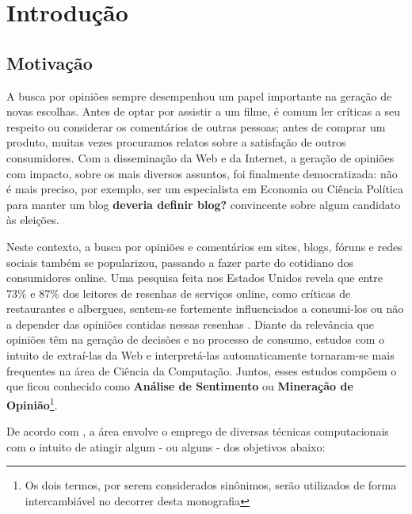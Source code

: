 \chapter{Introdução}

\section{Motivação}

A busca por opiniões sempre desempenhou um papel importante na geração de novas escolhas. Antes de optar por assistir a um filme, é comum ler críticas a seu respeito ou considerar os comentários de outras pessoas; antes de comprar um produto, muitas vezes procuramos relatos sobre a satisfação de outros consumidores. Com a disseminação da Web e da Internet, a geração de opiniões com impacto, sobre os mais diversos assuntos, foi finalmente democratizada: não é mais preciso, por exemplo, ser um especialista em Economia ou Ciência Política para manter um blog \textbf{deveria definir blog?} convincente sobre algum candidato às eleições.

Neste contexto, a busca por opiniões e comentários em sites, blogs, fóruns e redes sociais também se popularizou, passando a fazer parte do cotidiano dos consumidores online. Uma pesquisa feita nos Estados Unidos revela que entre 73\% e 87\% dos leitores de resenhas de serviços online, como críticas de restaurantes e albergues, sentem-se fortemente influenciados a consumi-los ou não a depender das opiniões contidas nessas resenhas \cite{pesquisa-eua}. Diante da relevância que opiniões têm na geração de decisões e no processo de consumo, estudos com o intuito de extraí-las da Web e interpretá-las automaticamente tornaram-se mais frequentes na área de Ciência da Computação. Juntos, esses estudos compõem o que ficou conhecido como \textbf{Análise de Sentimento} ou \textbf{Mineração de Opinião}\footnote{Os dois termos, por serem considerados sinônimos, serão utilizados de forma intercambiável no decorrer desta monografia}.

De acordo com \cite{pang-lee-survey}, a área envolve o emprego de diversas técnicas computacionais com o intuito de atingir algum - ou alguns - dos objetivos abaixo:

